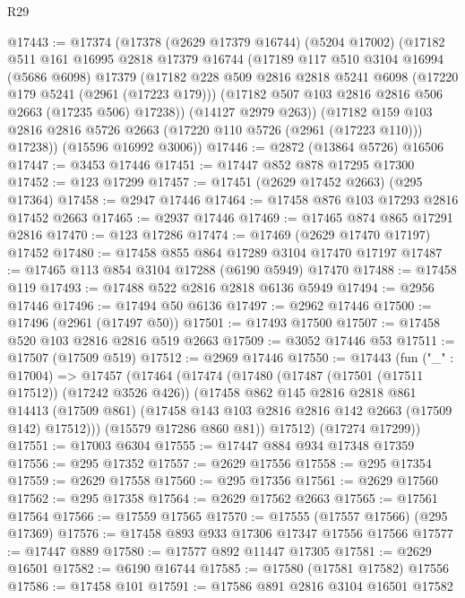 \begin{lexlean}{R29}
\begin{coremodule}
@17443 := @17374
    (@17378
      (@2629 @17379 @16744)
      (@5204 @17002)
      (@17182
        @511
        @161
        @16995
        @2818
        @17379
        @16744
        (@17189
          @117
          @510
          @3104
          @16994
          (@5686 @6098)
          @17379
          (@17182
            @228
            @509
            @2816
            @2818
            @5241
            @6098
            (@17220 @179 @5241 (@2961 (@17223 @179)))
            (@17182 @507 @103 @2816 @2816 @506 @2663 (@17235 @506) @17238))
          (@14127 @2979 @263))
        (@17182 @159 @103 @2816 @2816 @5726 @2663 (@17220 @110 @5726 (@2961 (@17223 @110))) @17238))
      (@15596 @16992 @3006))
@17446 := @2872 (@13864 @5726) @16506
@17447 := @3453 @17446
@17451 := @17447 @852 @878 @17295 @17300
@17452 := @123 @17299
@17457 := @17451 (@2629 @17452 @2663) (@295 @17364)
@17458 := @2947 @17446
@17464 := @17458 @876 @103 @17293 @2816 @17452 @2663
@17465 := @2937 @17446
@17469 := @17465 @874 @865 @17291 @2816
@17470 := @123 @17286
@17474 := @17469 (@2629 @17470 @17197) @17452
@17480 := @17458 @855 @864 @17289 @3104 @17470 @17197
@17487 := @17465 @113 @854 @3104 @17288 (@6190 @5949) @17470
@17488 := @17458 @119
@17493 := @17488 @522 @2816 @2818 @6136 @5949
@17494 := @2956 @17446
@17496 := @17494 @50 @6136
@17497 := @2962 @17446
@17500 := @17496 (@2961 (@17497 @50))
@17501 := @17493 @17500
@17507 := @17458 @520 @103 @2816 @2816 @519 @2663
@17509 := @3052 @17446 @53
@17511 := @17507 (@17509 @519)
@17512 := @2969 @17446
@17550 := @17443
    (fun ("_" : @17004) =>
    @17457
      (@17464
        (@17474
          (@17480
            (@17487 (@17501 (@17511 @17512)) (@17242 @3526 @426))
            (@17458
              @862
              @145
              @2816
              @2818
              @861
              @14413
              (@17509 @861)
              (@17458 @143 @103 @2816 @2816 @142 @2663 (@17509 @142) @17512)))
          (@15579 @17286 @860 @81))
        @17512)
      (@17274 @17299))
@17551 := @17003 @6304
@17555 := @17447 @884 @934 @17348 @17359
@17556 := @295 @17352
@17557 := @2629 @17556
@17558 := @295 @17354
@17559 := @2629 @17558
@17560 := @295 @17356
@17561 := @2629 @17560
@17562 := @295 @17358
@17564 := @2629 @17562 @2663
@17565 := @17561 @17564
@17566 := @17559 @17565
@17570 := @17555 (@17557 @17566) (@295 @17369)
@17576 := @17458 @893 @933 @17306 @17347 @17556 @17566
@17577 := @17447 @889
@17580 := @17577 @892 @11447 @17305
@17581 := @2629 @16501
@17582 := @6190 @16744
@17585 := @17580 (@17581 @17582) @17556
@17586 := @17458 @101
@17591 := @17586 @891 @2816 @3104 @16501 @17582

\end{coremodule}
\end{lexlean}
